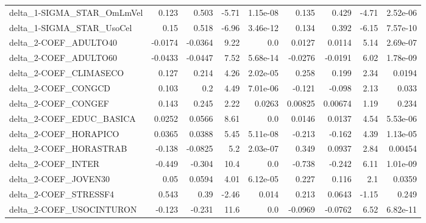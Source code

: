 \begin{tabular}{lrrrrrrrr}
delta\_1-SIGMA\_STAR\_OmLmVel            &       0.123 &        0.503 &    -5.71 & 1.15e-08 &      0.135 &       0.429 &        -4.71 &      2.52e-06 \\
delta\_1-SIGMA\_STAR\_UsoCel             &        0.15 &        0.518 &    -6.96 & 3.46e-12 &      0.134 &       0.392 &        -6.15 &      7.57e-10 \\
delta\_2-COEF\_ADULTO40                 &     -0.0174 &      -0.0364 &     9.22 &      0.0 &     0.0127 &      0.0114 &         5.14 &      2.69e-07 \\
delta\_2-COEF\_ADULTO60                 &     -0.0433 &      -0.0447 &     7.52 & 5.68e-14 &    -0.0276 &     -0.0191 &         6.02 &      1.78e-09 \\
delta\_2-COEF\_CLIMASECO                &       0.127 &        0.214 &     4.26 & 2.02e-05 &      0.258 &       0.199 &         2.34 &        0.0194 \\
delta\_2-COEF\_CONGCD                   &       0.103 &          0.2 &     4.49 & 7.01e-06 &     -0.121 &      -0.098 &         2.13 &         0.033 \\
delta\_2-COEF\_CONGEF                   &       0.143 &        0.245 &     2.22 &   0.0263 &    0.00825 &     0.00674 &         1.19 &         0.234 \\
delta\_2-COEF\_EDUC\_BASICA              &      0.0252 &       0.0566 &     8.61 &      0.0 &     0.0146 &      0.0137 &         4.54 &      5.53e-06 \\
delta\_2-COEF\_HORAPICO                 &      0.0365 &       0.0388 &     5.45 & 5.11e-08 &     -0.213 &      -0.162 &         4.39 &      1.13e-05 \\
delta\_2-COEF\_HORASTRAB                &      -0.138 &      -0.0825 &      5.2 & 2.03e-07 &      0.349 &      0.0937 &         2.84 &       0.00454 \\
delta\_2-COEF\_INTER                    &      -0.449 &       -0.304 &     10.4 &      0.0 &     -0.738 &      -0.242 &         6.11 &      1.01e-09 \\
delta\_2-COEF\_JOVEN30                  &        0.05 &       0.0594 &     4.01 & 6.12e-05 &      0.227 &       0.116 &          2.1 &        0.0359 \\
delta\_2-COEF\_STRESSF4                 &       0.543 &         0.39 &    -2.46 &    0.014 &      0.213 &      0.0643 &        -1.15 &         0.249 \\
delta\_2-COEF\_USOCINTURON              &      -0.123 &       -0.231 &     11.6 &      0.0 &    -0.0969 &     -0.0762 &         6.52 &      6.82e-11 \\

\end{tabular}
